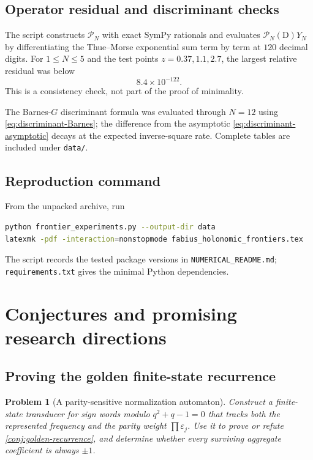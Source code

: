 \documentclass[11pt]{article}
\numberwithin{equation}{section}
\newtheorem{problem}[theorem]{Problem}
\theoremstyle{definition}
\theoremstyle{remark}
\newcommand{\D}{\mathrm D}
\newcommand{\eps}{\varepsilon}
\begin{document}
\subsection{Operator residual and discriminant checks}

The script constructs $\mathcal P_N$ with exact SymPy rationals and evaluates
$\mathcal P_N(\D)Y_N$ by differentiating the Thue--Morse exponential sum term
by term at $120$ decimal digits.  For $1\le N\le5$ and the test points
$z=0.37,1.1,2.7$, the largest relative residual was below
\begin{equation}
 8.4\times10^{-122}.
 \label{eq:residual-bound}
\end{equation}
This is a consistency check, not part of the proof of minimality.

The Barnes-$G$ discriminant formula was evaluated through $N=12$ using
\eqref{eq:discriminant-Barnes}; the difference from the asymptotic
\eqref{eq:discriminant-asymptotic} decays at the expected inverse-square rate.
Complete tables are included under \texttt{data/}.

\subsection{Reproduction command}

From the unpacked archive, run
\begin{lstlisting}[language=bash]
python frontier_experiments.py --output-dir data
latexmk -pdf -interaction=nonstopmode fabius_holonomic_frontiers.tex
\end{lstlisting}
The script records the tested package versions in
\texttt{NUMERICAL\_README.md}; \texttt{requirements.txt} gives the minimal
Python dependencies.

\section{Conjectures and promising research directions}
\label{sec:future}

\subsection{Proving the golden finite-state recurrence}

\begin{problem}[A parity-sensitive normalization automaton]
\label{problem:golden-automaton}
Construct a finite-state transducer for sign words modulo
$q^2+q-1=0$ that tracks both the represented frequency and the parity weight
$\prod\eps_j$.  Use it to prove or refute
\cref{conj:golden-recurrence}, and determine whether every surviving aggregate
coefficient is always $\pm1$.
\end{problem}
\end{document}
